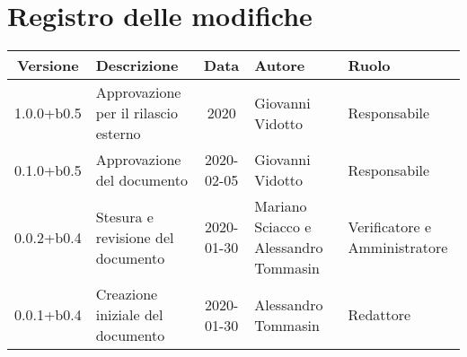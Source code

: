 \section*{Registro delle modifiche}

\begin{center}
	\begin{longtable}{|c|p{3.5cm}|c|p{3cm}|p{3cm}|}
	\hline
	\rowcolor{lighter-grayer}
	\textbf{Versione} & \textbf{Descrizione} & \textbf{Data} & \textbf{Autore} & \textbf{Ruolo} \\
	\hline
	\endfirsthead


	1.0.0+b0.5 & Approvazione per il rilascio esterno & 2020 & Giovanni Vidotto & Responsabile \\
	\hline
	0.1.0+b0.5 & Approvazione del documento & 2020-02-05 & Giovanni Vidotto & Responsabile \\
	\hline
	0.0.2+b0.4 & Stesura e revisione del documento & 2020-01-30 & Mariano Sciacco e Alessandro Tommasin & Verificatore e Amministratore \\
	\hline
	0.0.1+b0.4 & Creazione iniziale del documento & 2020-01-30 & Alessandro Tommasin & Redattore \\
	\hline

	\end{longtable}
\end{center}